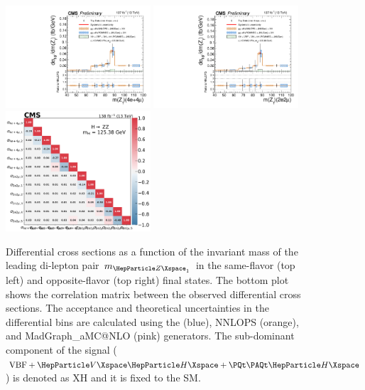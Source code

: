 \begin{center}
	\begin{figure}[!htb]
		\centering
		\includegraphics[width=0.48\textwidth]{Images/H4L/ZCands/model_v4/massZ1_unfoldwith_4l_SM_125_asimov.pdf}
		\includegraphics[width=0.48\textwidth]{Images/H4L/ZCands/model_v4/massZ1_unfoldwith_2e2mu_SM_125_asimov.pdf}\\
		\includegraphics[width=0.48\textwidth]{Images/H4L/correlations/corr_massZ1_v4.pdf}\\	
		\caption{
			Differential cross sections as a function of the invariant mass of the leading di-lepton pair $m_{\PZ_{1}}$ in the same-flavor (top left) and opposite-flavor (top right)  final states.
			The bottom plot shows the correlation matrix between the observed differential cross sections.
			The acceptance and theoretical uncertainties in the differential bins are calculated using the \POWHEG (blue), NNLOPS (orange), and MadGraph\_aMC@NLO (pink) generators.
			The sub-dominant component of the signal ($\VBF + \VH + \ttH$) is denoted as XH and it is fixed to the SM.
			\label{fig:fidMZ1}}
	\end{figure}
\end{center}

